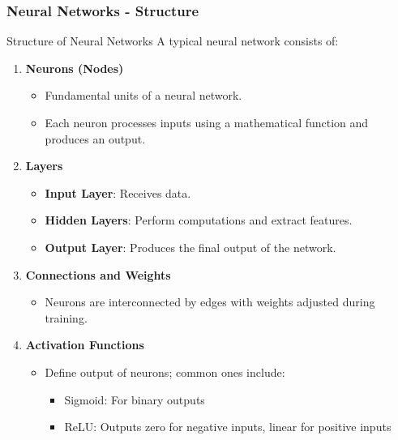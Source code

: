 \documentclass[aspectratio=169]{beamer}
\begin{document}
\begin{frame}[fragile]
    \frametitle{Neural Networks - Structure}
    \begin{block}{Structure of Neural Networks}
        A typical neural network consists of:
        \begin{enumerate}
            \item \textbf{Neurons (Nodes)} 
                \begin{itemize}
                    \item Fundamental units of a neural network.
                    \item Each neuron processes inputs using a mathematical function and produces an output.
                \end{itemize}
            \item \textbf{Layers}
                \begin{itemize}
                    \item \textbf{Input Layer}: Receives data.
                    \item \textbf{Hidden Layers}: Perform computations and extract features.
                    \item \textbf{Output Layer}: Produces the final output of the network.
                \end{itemize}
            \item \textbf{Connections and Weights}
                \begin{itemize}
                    \item Neurons are interconnected by edges with weights adjusted during training.
                \end{itemize}
            \item \textbf{Activation Functions}
                \begin{itemize}
                    \item Define output of neurons; common ones include:
                    \begin{itemize}
                        \item Sigmoid: For binary outputs
                        \item ReLU: Outputs zero for negative inputs, linear for positive inputs
                    \end{itemize}
                \end{itemize}
        \end{enumerate}
    \end{block}
\end{frame}
\end{document}
